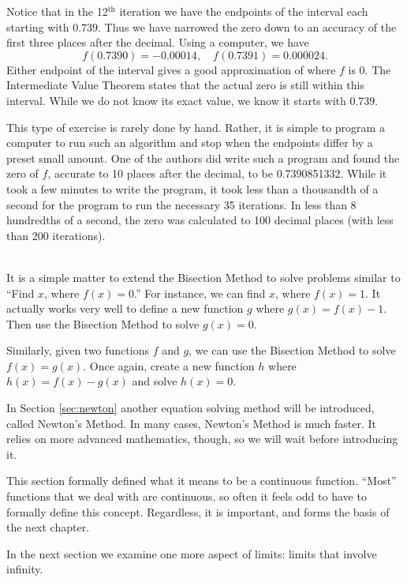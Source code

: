 {Notice that in the 12$^\text{th}$ iteration we have the endpoints of the interval each starting with $0.739$. Thus we have narrowed the zero down to an accuracy of the first three places after the decimal. Using a computer, we have 
$$ f(0.7390) = -0.00014, \quad f(0.7391) = 0.000024.$$ Either endpoint of the interval gives a good approximation of where $f$ is 0. The Intermediate Value Theorem states that the actual zero is still within this interval. While we do not know its exact value, we know it starts with $0.739$. 

This type of exercise is rarely done by hand. Rather, it is simple to program a computer to run such an algorithm and stop when the endpoints differ by a preset small amount. One of the authors did write such a program and found the zero of $f$, accurate to 10 places after the decimal, to be 0.7390851332. While it took a few minutes to write the program, it took less than a thousandth of a second for the program to run the necessary 35 iterations. In less than 8 hundredths of a second, the zero was calculated to 100 decimal places (with less than 200 iterations).
}\\

It is a simple matter to extend the Bisection Method to solve problems similar to ``Find $x$, where $f(x) = 0$.'' For instance, we can find $x$, where $f(x) = 1$. %
It actually works very well to define a new function $g$ where $g(x) = f(x) - 1$. Then use the Bisection Method to solve $g(x)=0$.  
\enlargethispage{2\baselineskip}

Similarly, given two functions $f$ and $g$, we can use the Bisection Method to solve $f(x) = g(x)$. Once again, create a new function $h$ where $h(x) = f(x)-g(x)$ and solve $h(x) = 0$. 

In Section \ref{sec:newton} another equation solving method will be introduced, called Newton's Method. In many cases, Newton's Method is much faster. It relies on more advanced mathematics, though, so we will wait before introducing it. 

This section formally defined what it means to be a continuous function. ``Most'' functions that we deal with are continuous, so often it feels odd to have to formally define this concept. Regardless, it is important, and forms the basis of the next chapter.
\enlargethispage{\baselineskip}

In the next section we examine one more aspect of limits: limits that involve infinity.
		
